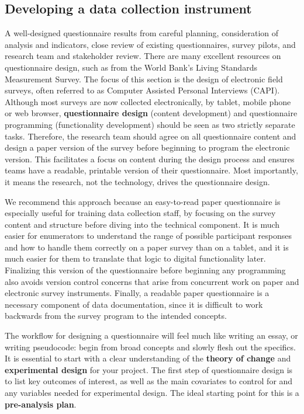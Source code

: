 \subsection{Developing a data collection instrument}

A well-designed questionnaire results from careful planning,
consideration of analysis and indicators, close review of existing questionnaires,
survey pilots, and research team and stakeholder review.
There are many excellent resources on questionnaire design,
such as from the World Bank's Living Standards Measurement Survey.\cite{glewwe2000designing}
The focus of this section is the design of electronic field surveys,
often referred to as Computer Assisted Personal Interviews (CAPI).
Although most surveys are now collected electronically, by tablet, mobile phone or web browser,
\textbf{questionnaire design}
(content development) and questionnaire programming (functionality development)
should be seen as two strictly separate tasks.
Therefore, the research team should agree on all questionnaire content
and design a paper version of the survey before beginning to program the electronic version.
This facilitates a focus on content during the design process
and ensures teams have a readable, printable version of their questionnaire.
Most importantly, it means the research, not the technology, drives the questionnaire design.

We recommend this approach because an easy-to-read paper questionnaire
is especially useful for training data collection staff,
by focusing on the survey content and structure before diving into the technical component.
It is much easier for enumerators to understand the range of possible participant responses
and how to handle them correctly on a paper survey than on a tablet,
and it is much easier for them to translate that logic to digital functionality later.
Finalizing this version of the questionnaire before beginning any programming
also avoids version control concerns that arise from concurrent work
on paper and electronic survey instruments.
Finally, a readable paper questionnaire is a necessary component of data documentation,
since it is difficult to work backwards from the survey program to the intended concepts.

The workflow for designing a questionnaire will feel much like writing an essay, or writing pseudocode:
begin from broad concepts and slowly flesh out the specifics.
It is essential to start with a clear understanding of the
\textbf{theory of change}
and \textbf{experimental design} for your project.
The first step of questionnaire design is to list key outcomes of interest,
as well as the main covariates to control for and any variables needed for experimental design.
The ideal starting point for this is a \textbf{pre-analysis plan}.

